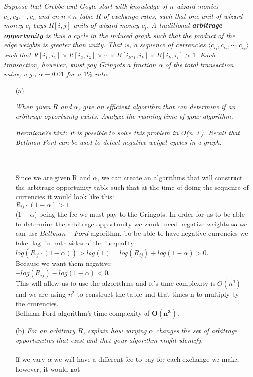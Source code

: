 \documentclass[12pt]{article} \setlength{\oddsidemargin}{0in}
\begin{document}
\textit{Suppose that Crabbe and Goyle start with knowledge of $n$ wizard monies $c_1, c_2, \cdots, c_n$
and an $n \times n$ table $R$ of exchange rates, such that one unit of wizard money $c_i$ buys
$R[i, j]$ units of wizard money $c_j$. A traditional \textbf{arbitrage opportunity} is thus a cycle
in the induced graph such that the product of the edge weights is greater than unity.
That is, a sequence of currencies $\langle c_{i_{1}}, c_{i_{2}} , \cdots , c_{i_{k}} \rangle$ such that $R[i_1, i_2] \times R[i_2, i_3] \times \cdots \times R[i_{k?1}, i_k] \times R[i_k, i_i] > 1$. Each transaction, however, must pay Gringots a fraction $\alpha$ of the total transaction value, e.g., $\alpha = 0.01$ for a $1\%$ rate.}

\begin{enumerate}
\item[(a)]{\textit{When given $R$ and $\alpha$, give an efficient algorithm that can determine if an arbitrage opportunity exists. Analyze the running time of your algorithm.}

    \textit{Hermione?s hint: It is possible to solve this problem in O(n 3 ). Recall that Bellman-Ford can be used to detect negative-weight cycles in a graph.}
  }
  \\\\
  Since we are given R and $\alpha$, we can create an algorithms that will construct the arbitrage opportunity table such that at the time of doing the sequence of currencies it would look like this:\\
  $R_{ij}\cdot(1-\alpha) > 1$ \\ ($1-\alpha$) being the fee we must pay to the Gringots. In order for us to be able to determine the arbitrage opportunity we would need negative weights so we can use $Bellman-Ford$ algorithm. To be able to have negative currencies we take $\log$ in both sides of the inequality:\\
  $log(R_{ij}\cdot(1-\alpha)) >log (1) = log(R_{ij}) + log(1-\alpha) > 0$. \\Because we want them negative:\\
  $- log(R_{ij}) - log(1-\alpha) < 0$. \\ This will allow us to use the algorithms and it's time complexity is $O(n^3)$ and we are using $n^2$ to construct the table and that times n to multiply by the currencies. \\
  Bellman-Ford algorithm's time complexity of $\mathbf{O(n^3)}$.\\
  
  
\item[(b)]{\textit{For an arbitrary $R$, explain how varying $\alpha$ changes the set of arbitrage opportunities that exist and that your algorithm might identify.}}
  \\\\
  If we vary $\alpha$ we will have a different fee to pay for each exchange we make, however, it would not 

\end{enumerate}
\end{document}
